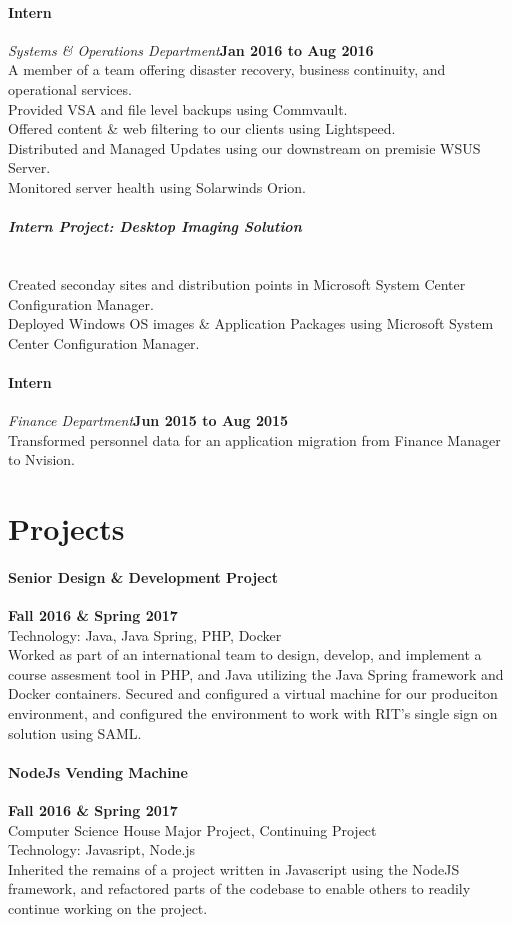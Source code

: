 \documentclass[10pt]{Article}
\begin{document}
\paragraph{\bf Intern}{\it Systems \& Operations Department}\hfill{\bf Jan 2016 to Aug 2016}\\
A member of a team offering disaster recovery, business continuity, and operational services.\\
Provided VSA and file level backups using Commvault.\\
Offered content \& web filtering to our clients using Lightspeed.\\
Distributed and Managed Updates using our downstream on premisie WSUS Server.\\
Monitored server health using Solarwinds Orion.
\paragraph{\it {\normalfont Intern Project: Desktop Imaging Solution}}~\\
Created seconday sites and distribution points in Microsoft System Center Configuration Manager.\\
Deployed Windows OS images \& Application Packages using Microsoft System Center Configuration Manager.
\paragraph{\bf Intern}{\it Finance Department}\hfill{\bf Jun 2015 to Aug 2015}\\
Transformed personnel data for an application migration from Finance Manager to Nvision.
\section*{\large Projects}
\paragraph{\bf Senior Design \& Development Project}\hfill{\bf Fall 2016 \& Spring 2017}\\
Technology: Java, Java Spring, PHP, Docker\\
Worked as part of an international team to design, develop, and implement a course assesment tool in PHP, and Java utilizing the Java Spring framework and Docker containers. Secured and configured a virtual machine for our produciton environment, and configured the environment to work with RIT's single sign on solution using SAML.
\paragraph{\bf NodeJs Vending Machine}\hfill{\bf Fall 2016 \& Spring 2017}\\
Computer Science House Major Project, Continuing Project\\
Technology: Javasript, Node.js\\
Inherited the remains of a project written in Javascript using the NodeJS framework, and refactored parts of the codebase to enable others to readily continue working on the project.
\end{document}
